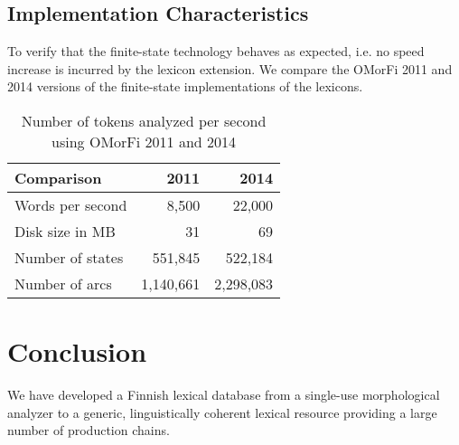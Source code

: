 \documentclass[11pt]{article}
\newif\ifcameraready
\begin{document}
\subsection{Implementation Characteristics}

To verify that the finite-state technology behaves as expected, i.e. no speed
increase is incurred by the lexicon extension.  We compare the OMorFi 2011 and
2014 versions of the finite-state implementations of the lexicons. 

\begin{table}[h]
    \begin{center}
        \begin{tabular}{|l|rr|}
            \hline
            \bf Comparison       & \bf 2011 & \bf 2014 \\
            \hline
            \sc Words per second           & 8,500           & 22,000\\
            \sc Disk size in MB                 & 31           & 69 \\
            \sc Number of states           & 551,845          & 522,184 \\
            \sc Number of arcs              & 1,140,661           & 2,298,083\\
            \hline
        \end{tabular}
    \end{center}
    \caption{Number of tokens analyzed per second using OMorFi 2011 and 2014}
\end{table}

\section{Conclusion}

We have developed a Finnish lexical database from a single-use morphological
analyzer to a generic, linguistically coherent lexical resource providing a
large number of production chains.

\ifcameraready
\section*{Acknowledgements}

\fi



\end{document}
